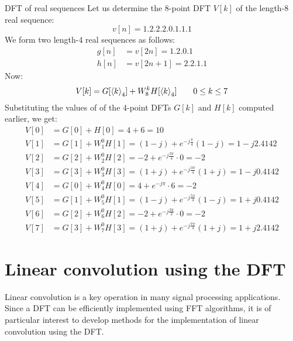 \documentclass[../../main/main.tex]{subfiles}
\begin{document}
\begin{example}{DFT of real sequences}{}
    Let us determine the 8-point DFT \( V[k] \) of the length-8 real sequence:
    \begin{equation}
        v[n]
        =
        \qty{1,2,2,2,0,1,1,1}
        \label{eq:L13_S12_1}
    \end{equation}
    We form two length-4 real sequences as follows:
    \begin{align}
        g[n] &= v[2n] = \qty{1,2,0,1}   \\
        h[n] &= v[2n+1] = \qty{2,2,1,1}
    \end{align}
    Now:
    \begin{equation}
        V[k]
        =
        G[\expval{k}_{4}] + W_{8}^{k} H[\expval{k}_{4}]
        \qquad
        0 \le k \le 7
        \label{eq:L13_S13_1}
    \end{equation}
    Substituting the values of of the 4-point DFTs \( G[k] \) and \( H[k] \) computed earlier, we get:
    \begin{align}
        V[0] &= G[0] +           H[0] = 4 + 6 = 10  \\
        V[1] &= G[1] + W_{1}^{0} H[1] = (1-j) + e^{-j \frac{\pi}{4}}(1-j) = 1 - j2.4142  \\
        V[2] &= G[2] + W_{2}^{0} H[2] = -2 + e^{-j\frac{3\pi}{4}} \cdot 0 = -2  \\
        V[3] &= G[3] + W_{3}^{0} H[3] = (1+j) + e^{-j \frac{3\pi}{4}}(1+j) = 1 - j0.4142 \\
        V[4] &= G[0] + W_{4}^{0} H[0] = 4 + e^{-j\pi} \cdot 6 = -2   \\
        V[5] &= G[1] + W_{5}^{0} H[1] = (1-j) + e^{-j \frac{5\pi}{4}}(1-j) = 1 + j0.4142    \\
        V[6] &= G[2] + W_{6}^{0} H[2] = -2 + e^{-j\frac{3\pi}{2}} \cdot 0 = -2  \\
        V[7] &= G[3] + W_{7}^{0} H[3] = (1+j) + e^{-j \frac{7\pi}{4}}(1+j) = 1 + j2.4142
    \end{align}
\end{example}




\section{Linear convolution using the DFT}
Linear convolution is a key operation in many signal processing applications. Since a DFT can be efficiently implemented using FFT algorithms, it is of particular interest to develop methods for the implementation of linear convolution using the DFT.
\end{document}

